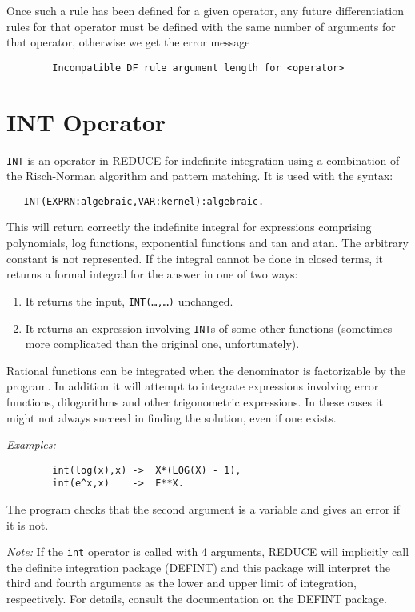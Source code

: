 \documentclass[11pt,letterpaper]{book}
\makeatletter
\newcommand{\REDUCE}{REDUCE}
\newcommand{\underscore}{\_}
\newcommand{\ttindex}[1]{{\renewcommand{\_}{\protect\underscore}%
                          \index{#1@{\tt #1}}}}
\makeatother
\begin{document}
Once such a rule has been defined for a given operator, any future
differentiation rules for that operator must be
defined with the same number of arguments for that operator, otherwise we
get the error message
{\small\begin{verbatim}
        Incompatible DF rule argument length for <operator>
\end{verbatim}}

\section{INT Operator}
{\tt INT}\ttindex{INT} is an operator in {\REDUCE} for indefinite
integration using a
combination of the Risch-Norman algorithm and pattern matching.  It is
used with the syntax:
{\small\begin{verbatim}
   INT(EXPRN:algebraic,VAR:kernel):algebraic.
\end{verbatim}}
This will return correctly the indefinite integral for expressions comprising
polynomials, log functions, exponential functions and tan and atan. The
arbitrary constant is not represented. If the integral cannot be done in
closed terms, it returns a formal integral for the answer in one of two ways:
\begin{enumerate}
\item It returns the input, {\tt INT(\ldots,\ldots)} unchanged.

\item It returns an expression involving {\tt INT}s of some
      other functions (sometimes more complicated than
      the original one, unfortunately).
\end{enumerate}
Rational functions can be integrated when the denominator is factorizable
by the program. In addition it will attempt to integrate expressions
involving error functions, dilogarithms and other trigonometric
expressions. In these cases it might not always succeed in finding the
solution, even if one exists.

{\it Examples:}
{\small\begin{verbatim}
        int(log(x),x) ->  X*(LOG(X) - 1),
        int(e^x,x)    ->  E**X.
\end{verbatim}}
The program checks that the second argument is a variable and gives an
error if it is not.

{\it Note:} If the {\tt int} operator is called with 4 arguments,
{\REDUCE} will implicitly call the definite integration package (DEFINT)
and this package will interpret the third and fourth arguments as the lower
and upper limit of integration, respectively.  For details, consult
the documentation on the DEFINT package.
\end{document}
